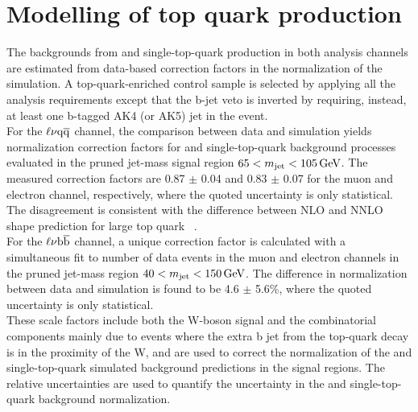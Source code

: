 \section{Modelling of top quark production}\label{sec:ttbar}

The backgrounds from \ttbar and single-top-quark production in both analysis channels are estimated from data-based correction factors in the normalization of the simulation.
A top-quark-enriched control sample is selected by applying all the analysis requirements except that the b-jet veto is inverted by requiring, instead, at least one b-tagged AK4 (or AK5) jet in the event.\\

For the $\ell\nu\mathrm{q}\overline{\mathrm{q}}$ channel, the comparison between data and simulation yields normalization correction factors for \ttbar and single-top-quark background processes evaluated in the pruned jet-mass signal region
$65 < m_{\text{jet}} < 105\,\text{Ge\hspace{-.08em}V}$. The measured correction factors are 0.87 $\pm$ 0.04 and 0.83 $\pm$ 0.07 for the muon and electron channel, respectively, where the quoted uncertainty is only statistical.
The disagreement is consistent with the difference between NLO and NNLO shape prediction for large top quark \pt~\cite{Czakon:2015owf}.\\

For the $\ell\nu{\mathrm{b}\overline{\mathrm{b}}}$ channel, a unique correction factor is calculated with a simultaneous fit to number of data events in the muon and electron channels in the pruned jet-mass region $40 < m_{\text{jet}} < 150\,\text{Ge\hspace{-.08em}V}$.
The difference in normalization between data and simulation is found to be 4.6 $\pm$ 5.6\%, where the quoted uncertainty is only statistical. \\

These scale factors include both the W-boson signal and the combinatorial components mainly due to events where the extra b jet from the top-quark decay is in the proximity of the W, and are used to correct the normalization
of the \ttbar and single-top-quark simulated background predictions in the signal regions. The relative uncertainties are used to quantify the uncertainty in the \ttbar and single-top-quark background normalization.

